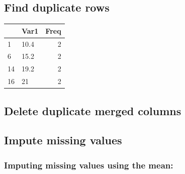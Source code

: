 \documentclass[
]{article}
\newenvironment{Shaded}{\begin{snugshade}}{\end{snugshade}}
\newcommand{\AttributeTok}[1]{\textcolor[rgb]{0.13,0.29,0.53}{#1}}
\newcommand{\CommentTok}[1]{\textcolor[rgb]{0.56,0.35,0.01}{\textit{#1}}}
\newcommand{\DecValTok}[1]{\textcolor[rgb]{0.00,0.00,0.81}{#1}}
\newcommand{\FunctionTok}[1]{\textcolor[rgb]{0.13,0.29,0.53}{\textbf{#1}}}
\newcommand{\NormalTok}[1]{#1}
\newcommand{\OtherTok}[1]{\textcolor[rgb]{0.56,0.35,0.01}{#1}}
\newcommand{\SpecialCharTok}[1]{\textcolor[rgb]{0.81,0.36,0.00}{\textbf{#1}}}
\begin{document}
\hypertarget{find-duplicate-rows}{%
\subsection{Find duplicate rows}\label{find-duplicate-rows}}

\begin{Shaded}
\end{Shaded}

\begin{table}
\centering
\begin{tabular}{l|l|r}
\hline
  & Var1 & Freq\\
\hline
1 & 10.4 & 2\\
\hline
6 & 15.2 & 2\\
\hline
14 & 19.2 & 2\\
\hline
16 & 21 & 2\\
\hline
\end{tabular}
\end{table}

\hypertarget{delete-duplicate-merged-columns}{%
\subsection{Delete duplicate merged columns}\label{delete-duplicate-merged-columns}}

\hypertarget{impute-missing-values}{%
\subsection{Impute missing values}\label{impute-missing-values}}

\hypertarget{imputing-missing-values-using-the-mean}{%
\subsubsection{Imputing missing values using the mean:}\label{imputing-missing-values-using-the-mean}}
\end{document}
